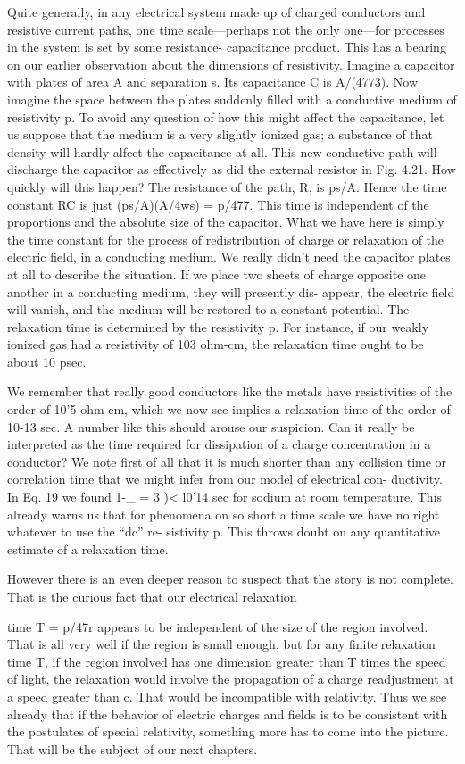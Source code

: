 Quite generally, in any electrical system made up of charged conductors
and resistive current paths, one time scale---perhaps not the
only one---for processes in the system is set by some resistance-
capacitance product. This has a bearing on our earlier observation
about the dimensions of resistivity. Imagine a capacitor with plates
of area A and separation s. Its capacitance C is A/(4773). Now
imagine the space between the plates suddenly filled with a conductive
medium of resistivity p. To avoid any question of how this might
affect the capacitance, let us suppose that the medium is a very
slightly ionized gas; a substance of that density will hardly alfect the
capacitance at all. This new conductive path will discharge the
capacitor as effectively as did the external resistor in Fig. 4.21. How
quickly will this happen? The resistance of the path, R, is ps/A.
Hence the time constant RC is just (ps/A)(A/4ws) = p/477. This
time is independent of the proportions and the absolute size of the
capacitor. What we have here is simply the time constant for the
process of redistribution of charge or relaxation of the electric field,
in a conducting medium. We really didn't need the capacitor plates
at all to describe the situation. If we place two sheets of charge opposite
one another in a conducting medium, they will presently dis-
appear, the electric field will vanish, and the medium will be restored
to a constant potential. The relaxation time is determined by the
resistivity p. For instance, if our weakly ionized gas had a resistivity
of 103 ohm-cm, the relaxation time ought to be about 10 psec.

We remember that really good conductors like the metals have
resistivities of the order of 10'5 ohm-cm, which we now see implies
a relaxation time of the order of 10-13 sec. A number like this should
arouse our suspicion. Can it really be interpreted as the time required
for dissipation of a charge concentration in a conductor? We
note first of all that it is much shorter than any collision time or correlation
time that we might infer from our model of electrical con-
ductivity. In Eq. 19 we found 1-_ = 3 )< l0'14 sec for sodium at
room temperature. This already warns us that for phenomena on
so short a time scale we have no right whatever to use the ``dc'' re-
sistivity p. This throws doubt on any quantitative estimate of a
relaxation time.

However there is an even deeper reason to suspect that the story
is not complete. That is the curious fact that our electrical relaxation

time T = p/47r appears to be independent of the size of the region
involved. That is all very well if the region is small enough, but for
any finite relaxation time T, if the region involved has one dimension
greater than T times the speed of light, the relaxation would involve
the propagation of a charge readjustment at a speed greater than c.
That would be incompatible with relativity. Thus we see already
that if the behavior of electric charges and fields is to be consistent
with the postulates of special relativity, something more has to come
into the picture. That will be the subject of our next chapters.

\fi
